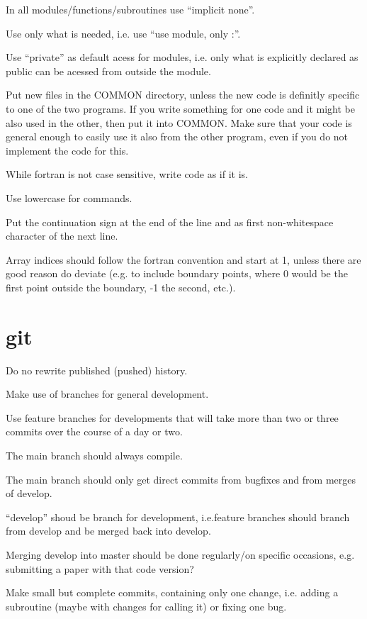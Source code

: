 \documentclass{article}
\begin{document}
In all modules/functions/subroutines use ``implicit none''.

Use only what is needed, i.e. use ``use module, only :''.

Use ``private'' as default acess for modules, i.e. only what is
explicitly declared as public can be acessed from outside the module.

Put new files in the COMMON directory, unless the new code is definitly
specific to one of the two programs.
If you write something for one code and it might be also used in the
other, then put it into COMMON. Make sure that your code is general
enough to easily use it also from the other program, even if you do not
implement the code for this.

While fortran is not case sensitive, write code as if it is.

Use lowercase for commands.

Put the continuation sign at the end of the line and as first
non-whitespace character of the next line.

Array indices should follow the fortran convention and start at 1,
unless there are good reason do deviate (e.g. to include boundary
points, where 0 would be the first point outside the boundary, -1 the
second, etc.).

\section{git}

Do no rewrite published (pushed) history.

Make use of branches for general development.

Use feature branches for developments that will take more than two or
three commits over the course of a day or two.

The main branch should always compile.

The main branch should only get direct commits from bugfixes and from
merges of develop.

``develop'' shoud be branch for development, i.e.feature branches should
branch from develop and be merged back into develop.

Merging develop into master should be done regularly/on specific
occasions, e.g. submitting a paper with that code version?

Make small but complete commits, containing only one change, i.e. adding
a subroutine (maybe with changes for calling it) or fixing one bug.
\end{document}
